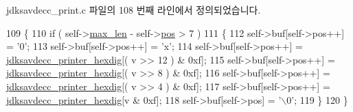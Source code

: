 jdksavdecc\+\_\+print.\+c 파일의 108 번째 라인에서 정의되었습니다.


\begin{DoxyCode}
109 \{
110     \textcolor{keywordflow}{if} ( self->\hyperlink{structjdksavdecc__printer_a956cb5a3c4322e6d67c2f2b21077716c}{max\_len} - self->\hyperlink{structjdksavdecc__printer_a5438a597ee291f523ae04a9fe355924f}{pos} > 7 )
111     \{
112         \textcolor{keyword}{self}->buf[\textcolor{keyword}{self}->pos++] = \textcolor{charliteral}{'0'};
113         \textcolor{keyword}{self}->buf[\textcolor{keyword}{self}->pos++] = \textcolor{charliteral}{'x'};
114         \textcolor{keyword}{self}->buf[\textcolor{keyword}{self}->pos++] = \hyperlink{jdksavdecc__print_8c_ad23c15dfac839a83ff16748e1737ba80}{jdksavdecc\_printer\_hexdig}[( v >> 12 ) & 0xf];
115         \textcolor{keyword}{self}->buf[\textcolor{keyword}{self}->pos++] = \hyperlink{jdksavdecc__print_8c_ad23c15dfac839a83ff16748e1737ba80}{jdksavdecc\_printer\_hexdig}[( v >> 8 ) & 0xf];
116         \textcolor{keyword}{self}->buf[\textcolor{keyword}{self}->pos++] = \hyperlink{jdksavdecc__print_8c_ad23c15dfac839a83ff16748e1737ba80}{jdksavdecc\_printer\_hexdig}[( v >> 4 ) & 0xf];
117         \textcolor{keyword}{self}->buf[\textcolor{keyword}{self}->pos++] = \hyperlink{jdksavdecc__print_8c_ad23c15dfac839a83ff16748e1737ba80}{jdksavdecc\_printer\_hexdig}[v & 0xf];
118         \textcolor{keyword}{self}->buf[\textcolor{keyword}{self}->pos] = \textcolor{charliteral}{'\(\backslash\)0'};
119     \}
120 \}
\end{DoxyCode}


